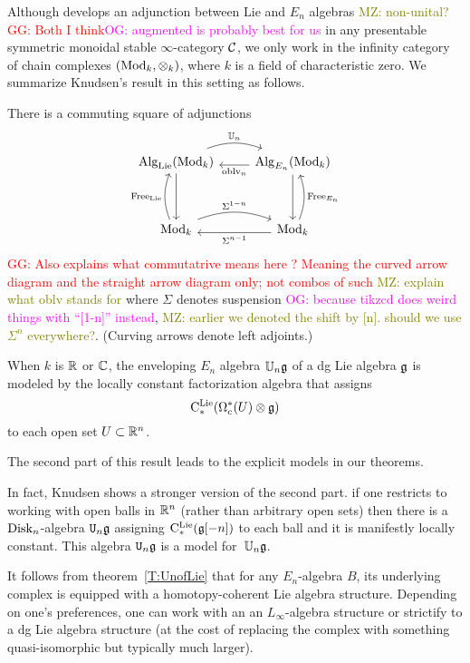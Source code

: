 \documentclass[11pt]{amsart}
\numberwithin{equation}{section}
\def\owen{\textcolor{magenta}{OG: }\textcolor{magenta}}
\def\mahmoud{\textcolor{olive}{MZ: }\textcolor{olive}}
\def\greg{\textcolor{red}{GG: }\textcolor{red}}
\begin{document}
Although \cite{Knudsen} develops an adjunction between Lie and $E_n$ algebras \mahmoud{non-unital?}\greg{Both I think}\owen{augmented is probably best for us}
in any presentable symmetric monoidal stable $\infty$-category $\mathcal C$,
we only work in the infinity category of chain complexes $({\rm Mod}_k, \otimes_k)$, where $k$ is a field of characteristic zero.
We summarize Knudsen's result in this setting as follows.

\begin{thm}\label{T:UnofLie}
There is a commuting square of adjunctions
\[
\begin{tikzcd}
\Alg_\Lie(\Mod_k) \arrow[r, bend left=20, shift left=.5ex,"\UU_n"] \arrow[dd] & \Alg_{E_n}(\Mod_k) \arrow[l, shift left=.5ex, "\oblv_n"] \arrow[dd]\\
&\\
\Mod_k \arrow[r, bend left=20, shift left=.5ex, "\Sigma^{1-n}"] \arrow[uu, bend left=20, shift left=.5ex, "\Free_\Lie"] & \Mod_k \arrow[l, shift left=.5ex,"\Sigma^{n-1}"] \arrow[uu, bend right=20, shift right=.5ex, "\Free_{E_n}"']
\end{tikzcd}
\]
\greg{Also explains what commutatrive means here ? Meaning the curved arrow diagram and the straight arrow diagram only; not combos of such}
\mahmoud{explain what oblv stands for}
where $\Sigma$ denotes suspension \owen{because tikzcd does weird things with ``[1-n]'' instead}, \mahmoud{earlier we denoted the shift by [n]. should we use $\Sigma^n$ everywhere?}.
(Curving arrows denote left adjoints.)

When $k$ is $\mathbb R$ or $\mathbb C$, 
the enveloping $E_n$ algebra $\mathbb U_n \mathfrak g$ of a dg Lie algebra $\mathfrak g$ is modeled by the locally constant factorization algebra that assigns
\[
{\rm C}^{\rm Lie}_*(\Omega^*_c(U) \otimes \mathfrak g)
\]
to each open set $U \subset \mathbb R^n$.
\end{thm}

The second part of this result leads to the explicit models in our theorems.

In fact, Knudsen shows a stronger version of the second part.
if one restricts to working with open balls in $\mathbb R^n$ (rather than arbitrary open sets)
then there is a ${\rm Disk}_n$-algebra ${\tt U}_n \mathfrak g$ assigning ${\rm C}^{\rm Lie}_*(\mathfrak g[-n])$ to each ball and it is manifestly locally constant.
This algebra ${\tt U}_n \mathfrak g$ is a model for~$\mathbb U_n \mathfrak g$.

\begin{rmk}
It follows from theorem~\ref{T:UnofLie} that for any $E_n$-algebra $B$, 
its underlying complex is equipped with a homotopy-coherent Lie algebra structure.
Depending on one's preferences, one can work with an an $L_\infty$-algebra structure or strictify to a dg Lie algebra structure (at the cost of replacing the complex with something quasi-isomorphic but typically much larger).
\end{rmk}
\end{document}
